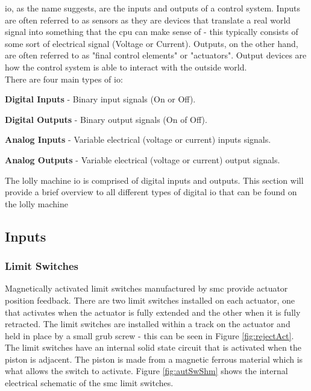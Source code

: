 \acrfull{io}, as the name suggests, are the inputs and outputs of a control system. Inputs are often referred to as sensors as they are devices that translate a real world signal into something that the \acrshort{cpu} can make sense of - this typically consists of some sort of electrical signal (Voltage or Current). Outputs, on the other hand, are often referred to as "final control elements" or "actuators". Output devices are how the control system is able to interact with the outside world.\\
There are four main types of \acrshort{io}:


\begin{description}
    \item\textbf{Digital Inputs} - Binary input signals (On or Off).
    \item\textbf{Digital Outputs} - Binary output signals (On of Off).
    \item\textbf{Analog Inputs} - Variable electrical (voltage or current) inputs signals.
    \item\textbf{Analog Outputs} - Variable electrical (voltage or current) output signals.
\end{description}
    
    
The lolly machine \acrshort{io} is comprised of digital inputs and outputs. This section will provide a brief overview to all different types of digital \acrshort{io} that can be found on the lolly machine


\subsection{Inputs}
    \subsubsection{Limit Switches}
        Magnetically activated limit switches manufactured by \acrshort{smc} provide actuator position feedback. There are two limit switches installed on each actuator, one that activates when the actuator is fully extended and the other when it is fully retracted. The limit switches are installed within a track on the actuator and held in place by a small grub screw - this can be seen in Figure \ref{fig:rejectAct}.
        The limit switches have an internal solid state circuit that is activated when the piston is adjacent. The piston is made from a magnetic ferrous material which is what allows the switch to activate. 
        Figure \ref{fig:autSwShm} shows the internal electrical schematic of the \acrshort{smc} limit switches.
        
